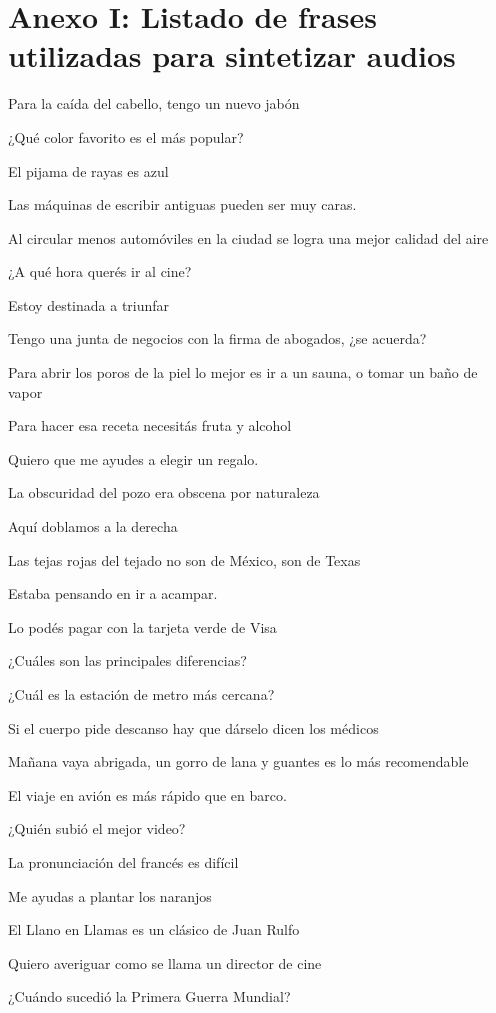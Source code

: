 \section{Anexo I: Listado de frases utilizadas para sintetizar audios}

Para la caída del cabello, tengo un nuevo jabón

¿Qué color favorito es el más popular?

El pijama de rayas es azul

Las máquinas de escribir antiguas pueden ser muy caras.

Al circular menos automóviles en la ciudad se logra una mejor calidad del aire

¿A qué hora querés ir al cine?

Estoy destinada a triunfar

Tengo una junta de negocios con la firma de abogados, ¿se acuerda?

Para abrir los poros de la piel lo mejor es ir a un sauna, o tomar un baño de vapor

Para hacer esa receta necesitás fruta y alcohol

Quiero que me ayudes a elegir un regalo.

La obscuridad del pozo era obscena por naturaleza

Aquí doblamos a la derecha

Las tejas rojas del tejado no son de México, son de Texas

Estaba pensando en ir a acampar.

Lo podés pagar con la tarjeta verde de Visa

¿Cuáles son las principales diferencias?

¿Cuál es la estación de metro más cercana?

Si el cuerpo pide descanso hay que dárselo dicen los médicos

Mañana vaya abrigada, un gorro de lana y guantes es lo más recomendable

El viaje en avión es más rápido que en barco.

¿Quién subió el mejor video?

La pronunciación del francés es difícil

Me ayudas a plantar los naranjos

El Llano en Llamas es un clásico de Juan Rulfo

Quiero averiguar como se llama un director de cine

¿Cuándo sucedió la Primera Guerra Mundial?


